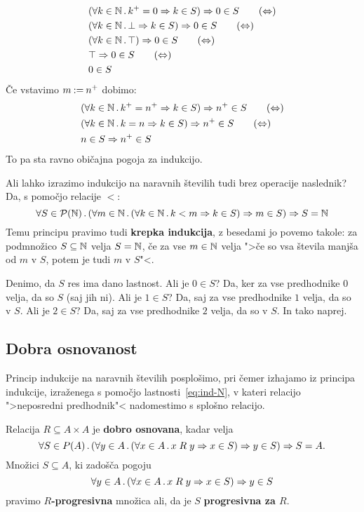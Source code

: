 %
\begin{align}
  &(\all{k \in \NN} \suc{k} = 0 \lthen k \in S) \lthen 0 \in S \tag{$\liff$} \\
  &(\all{k \in \NN} \bot \lthen k \in S) \lthen 0 \in S \tag{$\liff$} \\
  &(\all{k \in \NN} \top) \lthen 0 \in S \tag{$\liff$} \\
  &\top \lthen 0 \in S \tag{$\liff$} \\
  &0 \in S \notag
\end{align}
%
Če vstavimo $m \mathbin{{:}{=}} {n^{+}}$ dobimo:
%
\begin{align}
  &(\all{k \in \NN} \suc{k} = \suc{n} \lthen k \in S) \lthen \suc{n} \in S \tag{$\liff$} \\
  &(\all{k \in \NN} k = n \lthen k \in S) \lthen \suc{n} \in S \tag{$\liff$} \\
  &n \in S \lthen \suc{n} \in S \notag
\end{align}
%
To pa sta ravno običajna pogoja za indukcijo.

Ali lahko izrazimo indukcijo na naravnih številih tudi brez operacije naslednik?
Da, s pomočjo relacije $<$:
%
\begin{equation*}
    \forall S \in \mathcal{P}(\mathbb{N}) \,.\, (\forall m \in \mathbb{N} \,.\, (\forall k \in \mathbb{N} \,.\, k < m \Rightarrow k \in S) \Rightarrow m \in S) \Rightarrow S = \mathbb{N}
\end{equation*}
%
Temu principu pravimo tudi \textbf{krepka indukcija}, z besedami jo povemo takole: za podmnožico $S \subseteq \mathbb{N}$ velja
$S = \mathbb{N}$, če za vse $m \in \mathbb{N}$ velja ">če so vsa števila manjša od $m$ v $S$, potem je tudi $m$ v $S$"<.

Denimo, da $S$ res ima dano lastnost. Ali je $0 \in S$? Da, ker za vse predhodnike $0$ velja, da
so $S$ (saj jih ni). Ali je $1 \in S$? Da, saj za vse predhodnike $1$ velja, da so v $S$. Ali je $2 \in
S$? Da, saj za vse predhodnike $2$ velja, da so v $S$. In tako naprej.


\subsection{Dobra osnovanost}

Princip indukcije na naravnih številih posplošimo, pri čemer izhajamo iz principa indukcije, izraženega s pomočjo lastnosti~\eqref{eq:ind-N}, v kateri relacijo ">neposredni predhodnik"< nadomestimo s splošno relacijo.

\begin{definicija}
  Relacija $R \subseteq A \times A$ je \textbf{dobro osnovana}, kadar velja
  \begin{equation}
    \label{eq:ind-wf}%
    \all{S \in P(A)} (\all{y \in A} (\all{x \in A} x \rel{R} y \lthen x \in S) \lthen y \in S) \lthen S = A.
  \end{equation}
  Množici $S \subseteq A$, ki zadošča pogoju
  \begin{equation*}
  \forall y \in A \,.\, (\forall x \in A \,.\, x \mathrel{R} y \Rightarrow x \in S) \Rightarrow y \in S
  \end{equation*}
  pravimo \textbf{$R$-progresivna} množica ali, da je $S$ \textbf{progresivna za $R$}.
\end{definicija}

